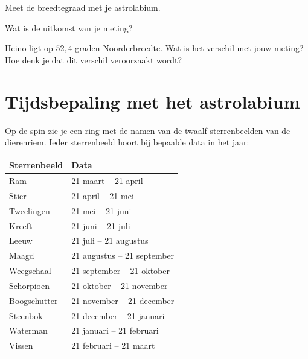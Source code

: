 \begin{opgave}
 Meet de breedtegraad met je astrolabium.
 \begin{subopgave}
  Wat is de uitkomst van je meting?
 \end{subopgave}
 \begin{subopgave}
  Heino ligt op $52,4$ graden Noorderbreedte. Wat is het verschil met jouw meting? Hoe denk je dat dit verschil veroorzaakt wordt?
 \end{subopgave}
\end{opgave}


\section{Tijdsbepaling met het astrolabium}

Op de spin zie je een ring met de namen van de twaalf sterrenbeelden van de dierenriem. Ieder sterrenbeeld hoort bij bepaalde data in het jaar:

\begin{center}
\begin{tabular}{|l|l|}
 \hline
 Sterrenbeeld & Data \\
 \hline
 Ram & 21 maart -- 21 april \\
 Stier & 21 april -- 21 mei \\
 Tweelingen & 21 mei -- 21 juni \\
 Kreeft & 21 juni -- 21 juli \\
 Leeuw & 21 juli -- 21 augustus \\
 Maagd & 21 augustus -- 21 september \\
 Weegschaal & 21 september -- 21 oktober \\
 Schorpioen & 21 oktober -- 21 november \\
 Boogschutter & 21 november -- 21 december \\
 Steenbok & 21 december -- 21 januari \\
 Waterman & 21 januari -- 21 februari \\
 Vissen & 21 februari -- 21 maart \\
 \hline
\end{tabular}
\end{center}

